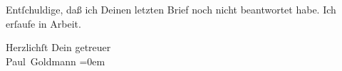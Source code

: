                Entſchuldige, daß ich Deinen letzten Brief noch nicht beantwortet habe. Ich erſaufe
               in Arbeit.\pend
           
\pstart
           Herzlichſt Dein getreuer {\\[\baselineskip]}\spacefill\mbox{Paul Goldmann}\pend
           \leftskip=0em{}\endnumbering{}  
      